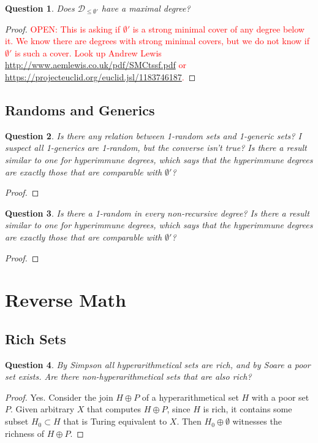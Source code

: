 \documentclass{article}
\newcommand{\OPEN}[1]{\textcolor{red}{OPEN: #1}}
\newtheorem{question}{Question}[subsection]
\begin{document}
    \begin{question}
      Does $\mathcal{D}_{\leq\emptyset'}$ have a maximal degree?
    \end{question}
    \begin{proof}
      \OPEN{This is asking if $\emptyset'$ is a strong minimal cover of any
      degree below it. We know there are degrees with strong minimal
      covers, but we do not know if $\emptyset'$ is such a cover. Look up
      Andrew Lewis \url{http://www.aemlewis.co.uk/pdf/SMCtssf.pdf} or
      \url{https://projecteuclid.org/euclid.jsl/1183746187}.}
    \end{proof}

  \subsection{Randoms and Generics}
    \begin{question}
      Is there any relation between 1-random sets and 1-generic sets? I
      suspect all 1-generics are 1-random, but the converse isn't true? Is
      there a result similar to one for hyperimmune degrees, which says
      that the hyperimmune degrees are exactly those that are comparable
      with $\emptyset'$?
    \end{question}
    \begin{proof}
    \end{proof}

    \begin{question}
      Is there a 1-random in every non-recursive degree? Is there a result
      similar to one for hyperimmune degrees, which says that the
      hyperimmune degrees are exactly those that are comparable with
      $\emptyset'$?
    \end{question}
    \begin{proof}
    \end{proof}

\section{Reverse Math}
  \subsection{Rich Sets}
    \begin{question}
      By Simpson all hyperarithmetical sets are rich, and by Soare a
      poor set exists. Are there non-hyperarithmetical sets that are also
      rich?
    \end{question}
    \begin{proof}
      Yes. Consider the join $H\oplus P$ of a hyperarithmetical set $H$
      with a poor set $P$. Given arbitrary $X$ that computes $H\oplus P$,
      since $H$ is rich, it contains some subset $H_0\subset H$ that is
      Turing equivalent to $X$. Then $H_0\oplus\emptyset$ witnesses the
      richness of $H\oplus P$.
    \end{proof}
\end{document}
